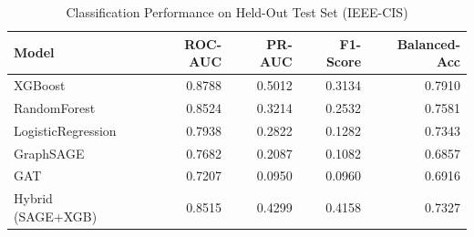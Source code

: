 \begin{table}
\caption{Classification Performance on Held-Out Test Set (IEEE-CIS)}
\label{tab:classification_metrics}
\begin{tabular}{lrrrr}
\toprule
Model & ROC-AUC & PR-AUC & F1-Score & Balanced-Acc \\
\midrule
XGBoost & 0.8788 & 0.5012 & 0.3134 & 0.7910 \\
RandomForest & 0.8524 & 0.3214 & 0.2532 & 0.7581 \\
LogisticRegression & 0.7938 & 0.2822 & 0.1282 & 0.7343 \\
GraphSAGE & 0.7682 & 0.2087 & 0.1082 & 0.6857 \\
GAT & 0.7207 & 0.0950 & 0.0960 & 0.6916 \\
Hybrid (SAGE+XGB) & 0.8515 & 0.4299 & 0.4158 & 0.7327 \\
\bottomrule
\end{tabular}
\end{table}
